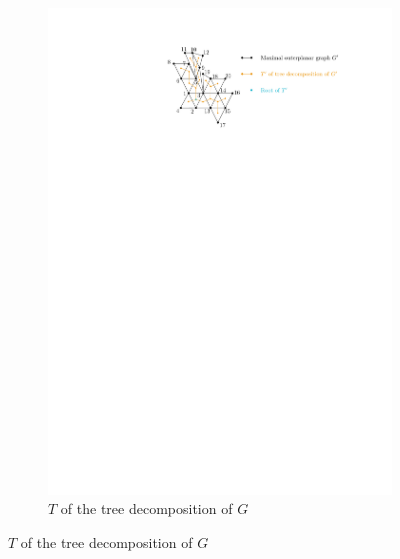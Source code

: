 \begin{figure}[H]
\begin{subfigure}{\textwidth}
	\end{subfigure}
	\begin{subfigure}{\textwidth}
	\centering
	\includegraphics[page=11,width=0.5\linewidth]{graphics/maximal_outerplanar_example_drawings.pdf}
		\caption{$T$ of the tree decomposition of $G$}
\end{subfigure}

\end{figure}



